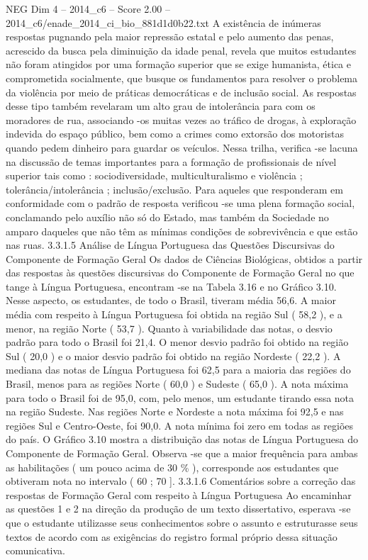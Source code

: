 \begin{textsample}{NEG Dim 4 – 2014\_c6 – Score 2.00 – 2014\_c6/enade\_2014\_ci\_bio\_881d1d0b22.txt}
A existência de inúmeras respostas pugnando pela maior repressão estatal e pelo aumento das penas, acrescido da busca pela diminuição da idade penal, revela que muitos estudantes não foram atingidos por uma formação superior que se exige humanista, ética e comprometida socialmente, que busque os fundamentos para resolver o problema da violência por meio de práticas democráticas e de inclusão social.
As respostas desse tipo também revelaram um alto grau de intolerância para com os moradores de rua, associando -os muitas vezes ao tráfico de drogas, à exploração indevida do espaço público, bem como a crimes como extorsão dos motoristas quando pedem dinheiro para guardar os veículos.
Nessa trilha, verifica -se lacuna na discussão de temas importantes para a formação de profissionais de nível superior tais como : sociodiversidade, multiculturalismo e violência ; tolerância/intolerância ; inclusão/exclusão.
Para aqueles que responderam em conformidade com o padrão de resposta verificou -se uma plena formação social, conclamando pelo auxílio não só do Estado, mas também da Sociedade no amparo daqueles que não têm as mínimas condições de sobrevivência e que estão nas ruas. 3.3.1.5 Análise de Língua Portuguesa das Questões Discursivas do Componente de Formação Geral Os dados de Ciências Biológicas, obtidos a partir das respostas às questões discursivas do Componente de Formação Geral no que tange à Língua Portuguesa, encontram -se na Tabela 3.16 e no Gráfico 3.10.
Nesse aspecto, os estudantes, de todo o Brasil, tiveram média 56,6.
A maior média com respeito à Língua Portuguesa foi obtida na região Sul ( 58,2 ), e a menor, na região Norte ( 53,7 ).
Quanto à variabilidade das notas, o desvio padrão para todo o Brasil foi 21,4.
O menor desvio padrão foi obtido na região Sul ( 20,0 ) e o maior desvio padrão foi obtido na região Nordeste ( 22,2 ).
A mediana das notas de Língua Portuguesa foi 62,5 para a maioria das regiões do Brasil, menos para as regiões Norte ( 60,0 ) e Sudeste ( 65,0 ).
A nota máxima para todo o Brasil foi de 95,0, com, pelo menos, um estudante tirando essa nota na região Sudeste.
Nas regiões Norte e Nordeste a nota máxima foi 92,5 e nas regiões Sul e Centro-Oeste, foi 90,0.
A nota mínima foi zero em todas as regiões do país.
O Gráfico 3.10 mostra a distribuição das notas de Língua Portuguesa do Componente de Formação Geral.
Observa -se que a maior frequência para ambas as habilitações ( um pouco acima de 30 \% ), corresponde aos estudantes que obtiveram nota no intervalo ( 60 ; 70 ]. 3.3.1.6 Comentários sobre a correção das respostas de Formação Geral com respeito à Língua Portuguesa Ao encaminhar as questões 1 e 2 na direção da produção de um texto dissertativo, esperava -se que o estudante utilizasse seus conhecimentos sobre o assunto e estruturasse seus textos de acordo com as exigências do registro formal próprio dessa situação comunicativa.

\end{textsample}
